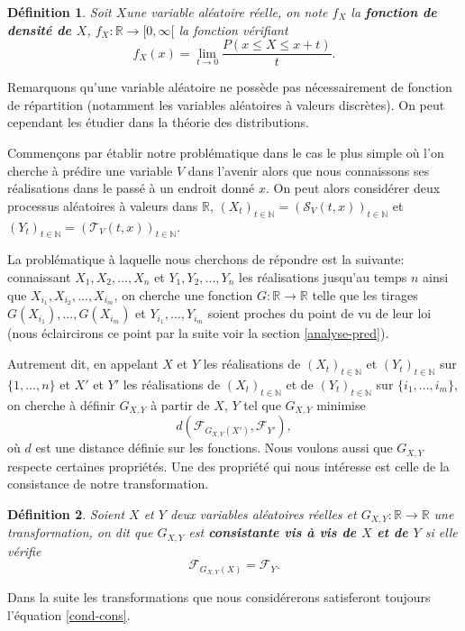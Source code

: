 \documentclass[a4paper,10pt]{article}
\newtheorem{definition}{Définition}
\begin{document}
	\begin{definition}
		Soit $X$une variable aléatoire réelle, on note $f_{X}$ la \textbf{fonction de densité de $X$}, $f_{X}: \mathbb{R}\to [0,\infty[$ la fonction vérifiant
		\begin{equation}
			f_{X}(x)=\lim_{t\to 0} \frac{P(x\leq X \leq x+t)}{t}.
		\end{equation}
	\end{definition}
	Remarquons qu'une variable aléatoire ne possède pas nécessairement de fonction de répartition (notamment les variables aléatoires à valeurs discrètes). On peut cependant les étudier dans la théorie des distributions.
	
	
	Commençons par établir notre problématique dans le cas le plus simple où l'on cherche à prédire une variable $V$ dans l'avenir alors que nous connaissons ses réalisations dans le passé à un endroit donné $x$.
	On peut alors considérer deux processus aléatoires à valeurs dans $\mathbb{R}$, $(X_t)_{t \in \mathbb{N}}=(\mathcal{S}_{V}(t, x))_{t \in \mathbb{N}}$ et $(Y_t)_{t \in \mathbb{N}}=(\mathcal{T}_{V}(t, x))_{t \in \mathbb{N}}$.
	
	La problématique à laquelle nous cherchons de répondre est la suivante: connaissant $X_1,X_2,...,X_n$ et $Y_1,Y_2,...,Y_n$ les réalisations jusqu'au temps $n$ ainsi que $X_{i_1},X_{i_2},...,X_{i_m}$, on cherche une fonction $G: \mathbb{R} \to \mathbb{R}$ telle que les tirages $G(X_{i_1}),..., G(X_{i_m})$ et $Y_{i_1},...,Y_{i_m}$ soient proches du point de vu de leur loi (nous éclaircirons ce point par la suite voir la section \ref{analyse-pred}). 
	
	Autrement dit, en appelant $X$ et $Y$ les réalisations de $(X_t)_{t \in \mathbb{N}}$ et $(Y_t)_{t \in \mathbb{N}}$ sur $\{1,...,n\}$ et $X'$ et $Y'$ les réalisations de $(X_t)_{t \in \mathbb{N}}$ et de $(Y_t)_{t \in \mathbb{N}}$ sur $\{i_1,...,i_m\}$, on cherche à définir $G_{X,Y}$ à partir de $X$, $Y$ tel que $G_{X,Y}$ minimise 
	\[d(\mathcal{F}_{G_{X,Y}(X')}, \mathcal{F}_{Y'}),\]
	où $d$ est une distance définie sur les fonctions.
	Nous voulons aussi que $G_{X,Y}$ respecte certaines propriétés. Une des propriété qui nous intéresse est celle de la consistance de notre transformation.
	
	\begin{definition}
		Soient $X$ et $Y$ deux variables aléatoires réelles et $G_{X,Y}: \mathbb{R}\to \mathbb{R}$ une transformation, on dit que $G_{X,Y}$ est \textbf{consistante vis à vis de $X$ et de $Y$} si elle vérifie 
		\begin{equation}
			\label{cond-cons}
			{\mathcal{F}_{G_{X,Y}(X)}}= \mathcal{F}_{Y}.
		\end{equation}
	\end{definition}
	Dans la suite les transformations que nous considérerons satisferont toujours l'équation \eqref{cond-cons}.
	
\end{document}
